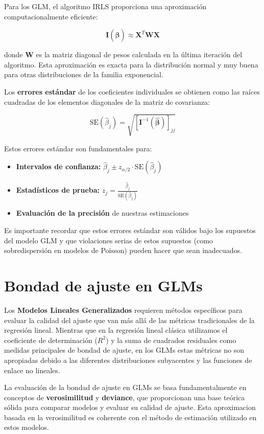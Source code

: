 \documentclass[
  letterpaper,
  DIV=11,
  numbers=noendperiod]{scrreprt}
\providecommand{\tightlist}{%
  \setlength{\itemsep}{0pt}\setlength{\parskip}{0pt}}
\begin{document}
Para los GLM, el algoritmo IRLS proporciona una aproximación
computacionalmente eficiente:

\[\mathbf{I}(\hat{\boldsymbol{\beta}}) \approx \mathbf{X}^T \mathbf{W} \mathbf{X}\]

donde \(\mathbf{W}\) es la matriz diagonal de pesos calculada en la
última iteración del algoritmo. Esta aproximación es exacta para la
distribución normal y muy buena para otras distribuciones de la familia
exponencial.

Los \textbf{errores estándar} de los coeficientes individuales se
obtienen como las raíces cuadradas de los elementos diagonales de la
matriz de covarianza:

\[\text{SE}(\hat{\beta}_j) = \sqrt{[\mathbf{I}^{-1}(\hat{\boldsymbol{\beta}})]_{jj}}\]

Estos errores estándar son fundamentales para:

\begin{itemize}
\tightlist
\item
  \textbf{Intervalos de confianza:}
  \(\hat{\beta}_j \pm z_{\alpha/2} \cdot \text{SE}(\hat{\beta}_j)\)
\item
  \textbf{Estadísticos de prueba:}
  \(z_j = \frac{\hat{\beta}_j}{\text{SE}(\hat{\beta}_j)}\)
\item
  \textbf{Evaluación de la precisión} de nuestras estimaciones
\end{itemize}

Es importante recordar que estos errores estándar son válidos bajo los
supuestos del modelo GLM y que violaciones serias de estos supuestos
(como sobredispersión en modelos de Poisson) pueden hacer que sean
inadecuados.

\section{Bondad de ajuste en GLMs}\label{bondad-de-ajuste-en-glms}

Los \textbf{Modelos Lineales Generalizados} requieren métodos
específicos para evaluar la calidad del ajuste que van más allá de las
métricas tradicionales de la regresión lineal. Mientras que en la
regresión lineal clásica utilizamos el coeficiente de determinación
(\(R^2\)) y la suma de cuadrados residuales como medidas principales de
bondad de ajuste, en los GLMs estas métricas no son apropiadas debido a
las diferentes distribuciones subyacentes y las funciones de enlace no
lineales.

La evaluación de la bondad de ajuste en GLMs se basa fundamentalmente en
conceptos de \textbf{verosimilitud} y \textbf{deviance}, que
proporcionan una base teórica sólida para comparar modelos y evaluar su
calidad de ajuste. Esta aproximacion basada en la verosimilitud es
coherente con el método de estimación utilizado en estos modelos.
\end{document}
